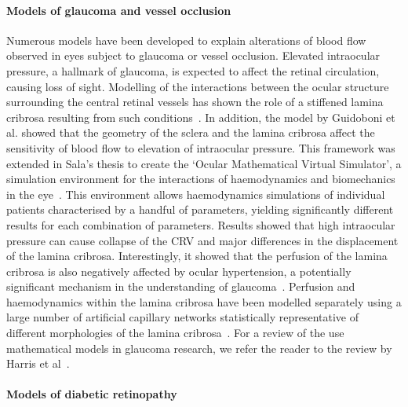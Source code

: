 \documentclass{article}
\begin{document}
\paragraph*{Models of glaucoma and vessel occlusion}

Numerous models have been developed to explain alterations of blood flow observed in eyes subject to glaucoma or vessel occlusion\cite{Chuangsuwanich_2016,Guidoboni_2014,Sala_2018,Sala_2020}.
Elevated intraocular pressure, a hallmark of glaucoma, is expected to affect the retinal circulation, causing loss of sight.
Modelling of the interactions between the ocular structure surrounding the central retinal vessels has shown the role of a stiffened lamina cribrosa resulting from such conditions~\cite{Guidoboni_2014}.
In addition, the model by Guidoboni et al. showed that the geometry of the sclera and the lamina cribrosa affect the sensitivity of blood flow to elevation of intraocular pressure.
This framework was extended in Sala's thesis to create the `Ocular Mathematical Virtual Simulator', a simulation environment for the interactions of haemodynamics and biomechanics in the eye~\cite{Sala_2018,Sala_2020}.
This environment allows haemodynamics simulations of individual patients characterised by a handful of parameters, yielding significantly different results for each combination of parameters.
Results showed that high intraocular pressure can cause collapse of the CRV and major differences in the displacement of the lamina cribrosa.
Interestingly, it showed that the perfusion of the lamina cribrosa is also negatively affected by ocular hypertension, a potentially significant mechanism in the understanding of glaucoma~\cite{Sala_2020}.
Perfusion and haemodynamics within the lamina cribrosa have been modelled separately using a large number of artificial capillary networks statistically representative of different morphologies of the lamina cribrosa~\cite{Chuangsuwanich_2016}.
For a review of the use mathematical models in glaucoma research, we refer the reader to the review by Harris et al~\cite{Harris_2013}.

\paragraph*{Models of diabetic retinopathy}
\end{document}
